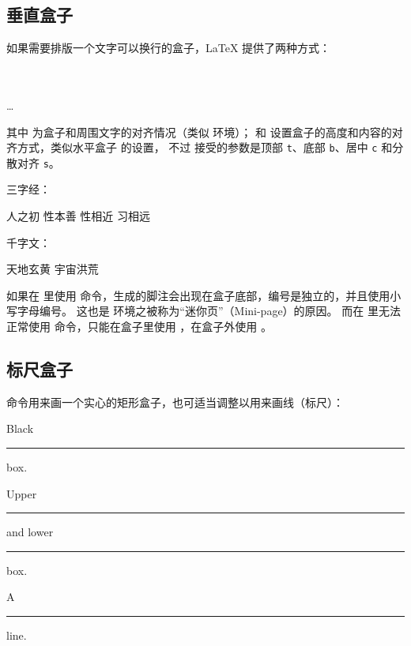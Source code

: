 \subsection{垂直盒子}\label{subsec:parbox}

如果需要排版一个文字可以换行的盒子，\LaTeX{} 提供了两种方式：
\begin{command}
\marg*{\ldots} \\[0.5ex]
 \\
\ldots \\
\end{command}

其中  为盒子和周围文字的对齐情况（类似  环境）；
 和  设置盒子的高度和内容的对齐方式，类似水平盒子  的设置，
不过  接受的参数是顶部 \texttt{t}、底部 \texttt{b}、居中 \texttt{c} 和分散对齐 \texttt{s}。

\begin{example}
三字经：\parbox[t]{3em}%
{人之初 性本善 性相近 习相远}
\quad
千字文：
\begin{minipage}[b][8ex][t]{4em}
天地玄黄 宇宙洪荒
\end{minipage}
\end{example}

如果在  里使用  命令，生成的脚注会出现在盒子底部，编号是独立的，并且使用小写字母编号。
这也是  环境之被称为“迷你页”（Mini-page）的原因。
而在  里无法正常使用  命令，只能在盒子里使用 ，在盒子外使用 。
\begin{example}
\end{example}

\subsection{标尺盒子}\label{subsec:rules}

 命令用来画一个实心的矩形盒子，也可适当调整以用来画线（标尺）：
\begin{command}
\end{command}
\begin{example}
Black \rule{12pt}{4pt} box.

Upper \rule[4pt]{6pt}{8pt} and
lower \rule[-4pt]{6pt}{8pt} box.

A \rule[-.4pt]{3em}{.4pt} line.
\end{example}

